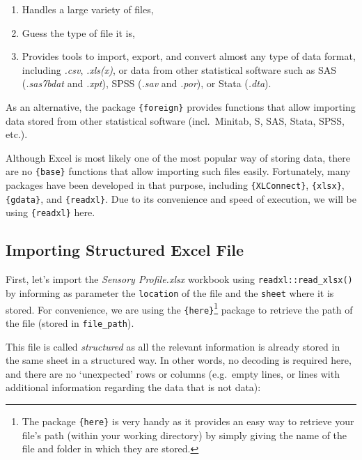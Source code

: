\documentclass[
]{book}
\providecommand{\tightlist}{%
  \setlength{\itemsep}{0pt}\setlength{\parskip}{0pt}}
\begin{document}
\begin{enumerate}
\def\labelenumi{\arabic{enumi}.}
\tightlist
\item
  Handles a large variety of files,
\item
  Guess the type of file it is,
\item
  Provides tools to import, export, and convert almost any type of data format, including \emph{.csv}, \emph{.xls(x)}, or data from other statistical software such as SAS (\emph{.sas7bdat} and \emph{.xpt}), SPSS (\emph{.sav} and \emph{.por}), or Stata (\emph{.dta}).
\end{enumerate}

As an alternative, the package \texttt{\{foreign\}} provides functions that allow importing data stored from other statistical software (incl.~Minitab, S, SAS, Stata, SPSS, etc.).

Although Excel is most likely one of the most popular way of storing data, there are no \texttt{\{base\}} functions that allow importing such files easily. Fortunately, many packages have been developed in that purpose, including \texttt{\{XLConnect\}}, \texttt{\{xlsx\}}, \texttt{\{gdata\}}, and \texttt{\{readxl\}}. Due to its convenience and speed of execution, we will be using \texttt{\{readxl\}} here.

\hypertarget{importing-structured-excel-file}{%
\subsection{Importing Structured Excel File}\label{importing-structured-excel-file}}

First, let's import the \emph{Sensory Profile.xlsx} workbook using \texttt{readxl::read\_xlsx()} by informing as parameter the \texttt{location} of the file and the \texttt{sheet} where it is stored. For convenience, we are using the \texttt{\{here\}}\footnote{The package \texttt{\{here\}} is very handy as it provides an easy way to retrieve your file's path (within your working directory) by simply giving the name of the file and folder in which they are stored.} package to retrieve the path of the file (stored in \texttt{file\_path}).

This file is called \emph{structured} as all the relevant information is already stored in the same sheet in a structured way. In other words, no decoding is required here, and there are no `unexpected' rows or columns (e.g.~empty lines, or lines with additional information regarding the data that is not data):
\end{document}

